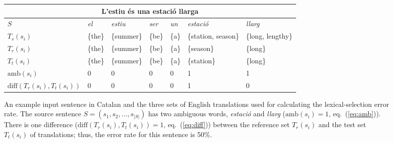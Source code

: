 \documentclass[11pt]{article}
\begin{document}
\begin{figure*}
\begin{center}
\setlength\tabcolsep{5.2pt}%
 \begin{tabular}{|l|llllll|}
   \hline
   \multicolumn{7}{|c|}{L'estiu \'{e}s una estaci\'{o} llarga}\\
   \hline
   $S$        & \emph{el} & \emph{estiu} & \emph{ser} & \emph{un} & \emph{estaci\'{o}} & \emph{llarg} \\
   \hline
   $T_s(s_i)$        & \{the\} & \{summer\} & \{be\} & \{a\} & \{station, season\} &  \{long, lengthy\} \\
   \hline 
   $T_r(s_i)$        & \{the\} & \{summer\} & \{be\} & \{a\} &  \{season\} & \{long\} \\
   \hline
   $T_t(s_i)$        & \{the\} & \{summer\} & \{be\} & \{a\} &  \{station\} & \{long\} \\
   \hline
   $\textrm{amb}(s_i)$ & 0     & 0          & 0      & 0     & 1            & 1 \\
   \hline
   $\mathrm{diff}(T_r(s_i), T_t(s_i))$ & 0     & 0          & 0      & 0     & 1            & 0 \\
   \hline
 \end{tabular}
 \caption{An example input sentence in Catalan and the three sets of
   English translations used for calculating the lexical-selection
   error rate. The source sentence $S = (s_1, s_2, \ldots, s_{|S|})$
   has two ambiguous words, \emph{estaci\'{o}} and \emph{llarg} (\(\mathrm{amb}(s_i)=1\), eq.~(\protect\ref{eq:amb})). There is one difference (\(\mathrm{diff}(T_r(s_i),T_t(s_i))=1\), eq.~(\protect\ref{eq:diff}))
   between the reference set $T_r(s_i)$ and the test set $T_t(s_i)$ of
   translations; thus, the error rate for this sentence is
   50\%.}
\label{fig:ler-example}
\end{center}
\end{figure*}

\end{document}
